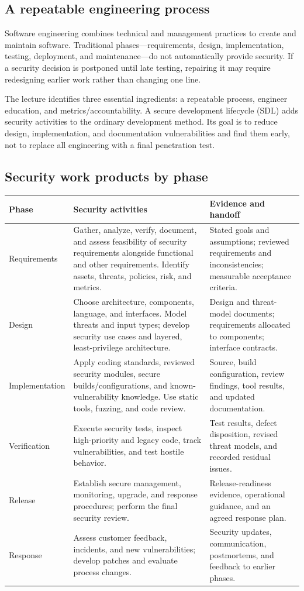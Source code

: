 \documentclass[11pt,a4paper]{article}
\numberwithin{figure}{section}
\begin{document}
\subsection{A repeatable engineering process}
Software engineering combines technical and management practices to create and maintain software. Traditional phases---requirements, design, implementation, testing, deployment, and maintenance---do not automatically provide security. If a security decision is postponed until late testing, repairing it may require redesigning earlier work rather than changing one line.

The lecture identifies three essential ingredients: a repeatable process, engineer education, and metrics/accountability. A secure development lifecycle (SDL) adds security activities to the ordinary development method. Its goal is to reduce design, implementation, and documentation vulnerabilities and find them early, not to replace all engineering with a final penetration test.

\subsection{Security work products by phase}
\begingroup\small
\begin{longtable}{@{}>{\raggedright\arraybackslash}p{30mm}>{\raggedright\arraybackslash}p{60mm}>{\raggedright\arraybackslash}p{59mm}@{}}
\toprule Phase & Security activities & Evidence and handoff\\\midrule\endhead
Requirements & Gather, analyze, verify, document, and assess feasibility of security requirements alongside functional and other requirements. Identify assets, threats, policies, risk, and metrics. & Stated goals and assumptions; reviewed requirements and inconsistencies; measurable acceptance criteria.\\
Design & Choose architecture, components, language, and interfaces. Model threats and input types; develop security use cases and layered, least-privilege architecture. & Design and threat-model documents; requirements allocated to components; interface contracts.\\
Implementation & Apply coding standards, reviewed security modules, secure builds/configurations, and known-vulnerability knowledge. Use static tools, fuzzing, and code review. & Source, build configuration, review findings, tool results, and updated documentation.\\
Verification & Execute security tests, inspect high-priority and legacy code, track vulnerabilities, and test hostile behavior. & Test results, defect disposition, revised threat models, and recorded residual issues.\\
Release & Establish secure management, monitoring, upgrade, and response procedures; perform the final security review. & Release-readiness evidence, operational guidance, and an agreed response plan.\\
Response & Assess customer feedback, incidents, and new vulnerabilities; develop patches and evaluate process changes. & Security updates, communication, postmortems, and feedback to earlier phases.\\\bottomrule
\end{longtable}
\end{document}
